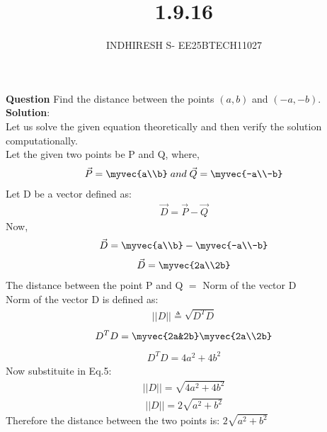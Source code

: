 \documentclass[journal]{IEEEtran}
\theoremstyle{remark}
\begin{document}

\onecolumn

\title{1.9.16}
\author{INDHIRESH S- EE25BTECH11027}
\maketitle


\renewcommand{\thefigure}{\theenumi}
\renewcommand{\thetable}{\theenumi}

\textbf{Question} Find the distance between the points $(a, b)$ and $(-a, -b)$.\\
\textbf{Solution}:\\
Let us solve the given equation theoretically and then verify the solution computationally. \\
Let the given two points be P and Q, where,
\begin{align}
    \Vec{P}=\myvec{a\\b} \; and\; \Vec{Q}=\myvec{-a\\-b}
\end{align}
Let D be a vector defined as:
\begin{align}
 \Vec{D}=\vec{P}-\Vec{Q}   
\end{align}
Now,
\begin{align}
    \vec{D}=\myvec{a\\b}-\myvec{-a\\-b}
\end{align}
\begin{align}
    \Vec{D}=\myvec{2a\\2b}
\end{align}
The distance between the point P and Q $=$ Norm of the vector D\\
Norm of the vector D is defined as:
\begin{align}
    ||D||\triangleq\sqrt{D^TD}
\end{align}
\begin{align}
    D^TD=\myvec{2a&2b}\myvec{2a\\2b}
\end{align}
\begin{align}
    D^TD=4a^2+4b^2
\end{align}
Now substituite in Eq.5:
\begin{align}
    ||D||=\sqrt{4a^2+4b^2}
\end{align}
\begin{align}
    ||D||=2\sqrt{a^2+b^2}
\end{align}
Therefore the distance between the two points is:    $2\sqrt{a^2+b^2}$\\\\
\end{document}
